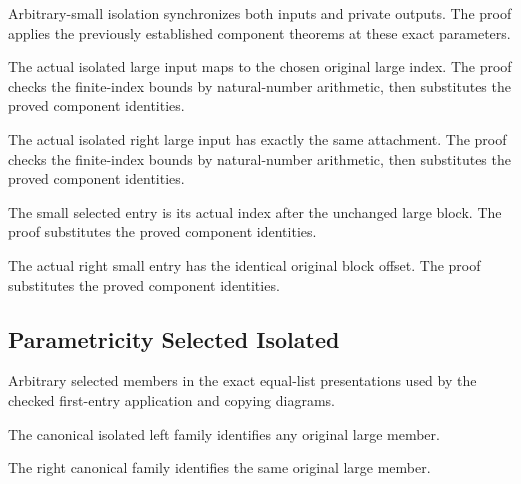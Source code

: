 Arbitrary-small isolation synchronizes both inputs and private outputs.
The proof applies the previously established component theorems at these exact parameters.
\par{}

The actual isolated large input maps to the chosen original large index.
The proof checks the finite-index bounds by natural-number arithmetic, then substitutes the proved component identities.
\par{}

The actual isolated right large input has exactly the same attachment.
The proof checks the finite-index bounds by natural-number arithmetic, then substitutes the proved component identities.
\par{}

The small selected entry is its actual index after the unchanged large block.
The proof substitutes the proved component identities.
\par{}

The actual right small entry has the identical original block offset.
The proof substitutes the proved component identities.
\par{}

\subsection{Parametricity Selected Isolated}
Arbitrary selected members in the exact equal-list presentations used
by the checked first-entry application and copying diagrams.

The canonical isolated left family identifies any original large member.
\par{}

The right canonical family identifies the same original large member.
\par{}

